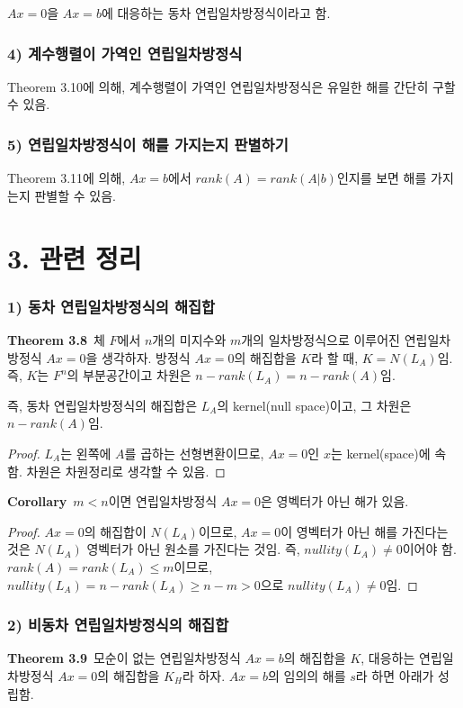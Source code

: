 $Ax=0$을 $Ax=b$에 대응하는 동차 연립일차방정식이라고 함.

\subsubsection*{4) 계수행렬이 가역인 연립일차방정식}
Theorem 3.10에 의해, 계수행렬이 가역인 연립일차방정식은 유일한 해를 간단히 구할 수 있음.

\subsubsection*{5) 연립일차방정식이 해를 가지는지 판별하기}
Theorem 3.11에 의해, $Ax=b$에서 $rank(A)=rank(A|b)$인지를 보면 해를 가지는지 판별할 수 있음.\\


\newpage


\section*{3. 관련 정리}
\subsubsection*{1) 동차 연립일차방정식의 해집합}
\textbf{Theorem 3.8}\, 체 $F$에서 $n$개의 미지수와 $m$개의 일차방정식으로 이루어진 연립일차방정식 $Ax=0$을 생각하자. 방정식 $Ax=0$의 해집합을 $K$라 할 때, $K=N(L_A)$임. 즉, $K$는 $F^n$의 부분공간이고 차원은 $n-rank(L_A)=n-rank(A)$임.

즉, 동차 연립일차방정식의 해집합은 $L_A$의 kernel(null space)이고, 그 차원은 $n-rank(A)$임.\\

\begin{proof}
$L_A$는 왼쪽에 $A$를 곱하는 선형변환이므로, $Ax=0$인 $x$는 kernel(space)에 속함. 차원은 차원정리로 생각할 수 있음.
\end{proof}

\textbf{Corollary}\, $m < n$이면 연립일차방정식 $Ax=0$은 영벡터가 아닌 해가 있음.

\begin{proof}
$Ax=0$의 해집합이 $N(L_A)$이므로, $Ax=0$이 영벡터가 아닌 해를 가진다는 것은 $N(L_A)$ 영벡터가 아닌 원소를 가진다는 것임. 즉, $nullity(L_A) \neq 0$이어야 함. $rank(A)=rank(L_A) \leq m$이므로, $nullity(L_A)=n-rank(L_A) \geq n-m > 0$으로 $nullity(L_A) \neq 0$임.
\end{proof}


\subsubsection*{2) 비동차 연립일차방정식의 해집합}
\textbf{Theorem 3.9}\, 모순이 없는 연립일차방정식 $Ax=b$의 해집합을 $K$, 대응하는 연립일차방정식 $Ax=0$의 해집합을 $K_H$라 하자. $Ax=b$의 임의의 해를 $s$라 하면 아래가 성립함.


